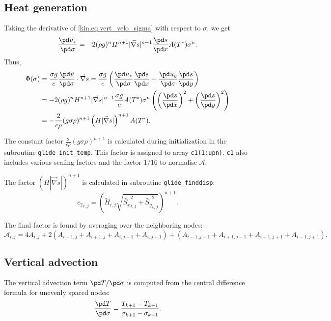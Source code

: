 \subsection{Heat generation}
Taking the derivative of \eqref{kin.eq.vert_velo_sigma} with respect to $\sigma$, we get
\begin{equation}
  \frac{\pd u_x}{\pd\sigma} = -2(\rho g)^nH^{n+1}|\vec\nabla s|^{n-1}\frac{\pd s}{\pd x}A(T^\ast)\sigma^n.
\end{equation}
Thus,
\begin{equation}
\begin{split}
  \Phi(\sigma) &= \frac{\sigma g}c\frac{\pd \vec{u}}{\pd\sigma}\cdot\vec\nabla s  = \frac{\sigma g}c\left(\frac{\pd u_x}{\pd \sigma}\frac{\pd s}{\pd x} + \frac{\pd u_y}{\pd \sigma}\frac{\pd s}{\pd y}\right)\\
       &= -2(\rho g)^nH^{n+1}|\vec\nabla s|^{n-1}\frac{\sigma g}cA(T^\ast)\sigma^n \left(\left(\frac{\pd s}{\pd x}\right)^2+\left(\frac{\pd s}{\pd y}\right)^2\right) \\
       &= -\frac2{c\rho}(g\sigma\rho)^{n+1}\left(H|\vec\nabla s|\right)^{n+1}A(T^\ast).
\end{split}  
\end{equation}

The constant factor $\frac2{c\rho}(g\sigma\rho)^{n+1}$ is calculated during initialization in the subroutine \texttt{glide\_init\_temp}. 
This factor is assigned to array \texttt{c1(1:upn)}. \texttt{c1} also includes various scaling factors and the factor $1/16$ to normalise $\mathcal{A}$.

The factor $\left(H|\vec\nabla s|\right)^{n+1}$ is calculated in subroutine \texttt{glide\_finddisp}:
\begin{equation}
  {c_2}_{i,j} = \left(\tilde{H}_{i,j}\sqrt{\tilde{S_x}_{i,j}^2+\tilde{S_y}_{i,j}^2}\right)^{n+1}.
\end{equation}

The final factor is found by averaging over the neighboring nodes:
\begin{equation}
  \mathcal{A}_{i,j}=4A_{i,j}+2(A_{i-1,j}+A_{i+1,j}+A_{i,j-1}+A_{i,j+1})+(A_{i-1,j-1}+A_{i+1,j-1}+A_{i+1,j+1}+A_{i-1,j+1}).
\end{equation}

\subsection{Vertical advection}\label{temp.sec.vert_ad}
The vertical advection term $\pd T/\pd\sigma$ is computed from the central difference formula for unevenly spaced nodes:
\begin{equation}
  \frac{\pd T}{\pd\sigma}=\frac{T_{k+1}-T_{k-1}}{\sigma_{k+1}-\sigma_{k-1}}.
\end{equation}

